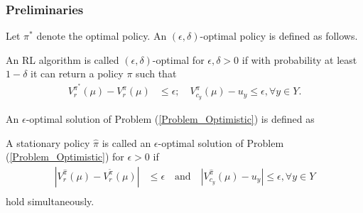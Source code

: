 \subsubsection{Preliminaries}

Let $\pi^*$ denote the optimal policy.
An $(\epsilon,\delta)$-optimal policy is defined as follows. 
\begin{definition}\label{Definition_PAC}
An RL algorithm is called $(\epsilon,\delta)$-optimal for $\epsilon,\delta>0$ if with probability at least $1-\delta$ it can return a policy $\pi$ such that
$$
\begin{aligned}
V_r^{\pi^*}(\mu)-V_r^{\pi}(\mu) &\leq \epsilon;\quad
V_{c_y}^{\pi}(\mu) - u_y  \leq \epsilon, \forall y\in Y.
\end{aligned}
$$
\end{definition}
An $\epsilon$-optimal solution of Problem (\ref{Problem_Optimistic}) is defined as \begin{definition}\label{Definition_Optimal_Solution}
A stationary policy $\hat\pi$ is called an $\epsilon$-optimal solution of Problem (\ref{Problem_Optimistic}) for $\epsilon>0$ if 
$$
\begin{aligned}
|V_r^{\hat\pi}(\mu)-V_r^{\tilde\pi}(\mu)| &\leq \epsilon \quad \mbox{and} \quad
|V_{c_y}^{\hat\pi}(\mu) - u_y|  \leq \epsilon,  \forall y\in Y \\
\end{aligned}
$$
hold simultaneously.
\end{definition}

